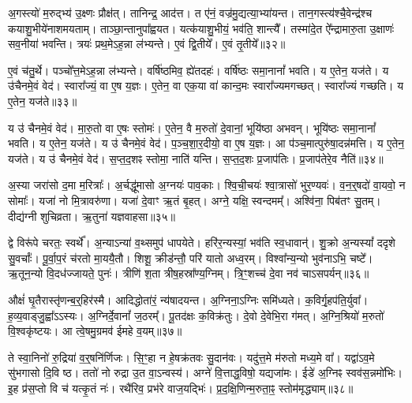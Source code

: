 अ॒गस्त्यो॑ म॒रुद्भ्य॑ उ॒क्ष्णः प्रौक्ष॑त्।
तानिन्द्र॒ आद॑त्त।
त ए॑नं॒ वज्र॑मु॒द्यत्या॒भ्या॑यन्त।
तान॒गस्त्य॑श्चै॒वेन्द्र॑श्च कयाशु॒भीये॑नाशमयताम्।
ताञ्छा॒न्तानुपा᳚ह्वयत।
यत्क॑याशु॒भीयं॒ भव॑ति॒ शान्त्यै᳚।
तस्मा॑दे॒त ऐ᳚न्द्रामारु॒ता उ॒क्षाणः॑ सव॒नीया॑ भवन्ति।
त्रयः॑ प्रथ॒मे\-ऽह॒न्ना ल॑भ्यन्ते।
ए॒वं द्वि॒तीये᳚।
ए॒वं तृ॒तीये᳚॥३२॥

ए॒वं च॑तु॒र्थे।
पञ्चो᳚त्त॒मे\-ऽह॒न्ना ल॑भ्यन्ते।
वर्\mbox{}षि॑ष्ठमिव॒ ह्ये॑तदहः॑।
वर्\mbox{}षि॑ष्ठः समा॒नानां᳚ भवति।
य ए॒तेन॒ यज॑ते।
य उ॑चैनमे॒वं वेद॑।
स्वारा᳚ज्यं॒ वा ए॒ष य॒ज्ञः।
ए॒तेन॒ वा एक॒या वा॑ कान्द॒मः स्वारा᳚ज्यमगच्छत्।
स्वारा᳚ज्यं गच्छति।
य ए॒तेन॒ यज॑ते॥३३॥

य उ॑ चैनमे॒वं वेद॑।
मा॒रु॒तो वा ए॒षः स्तोमः॑।
ए॒तेन॒ वै म॒रुतो॑ दे॒वानां॒ भूयि॑ष्ठा अभवन्।
भूयि॑ष्ठः समा॒नानां᳚ भवति।
य ए॒तेन॒ यज॑ते।
य उ॑ चैनमे॒वं वेद॑।
प॒ञ्च॒शा॒र॒दीयो॒ वा ए॒ष य॒ज्ञः।
आ प॑ञ्च॒मात्पुरु॑षा॒दन्न॑मत्ति।
य ए॒तेन॒ यज॑ते।
य उ॑ चैनमे॒वं वेद॑।
स॒प्त॒द॒शꣴ स्तोमा॒ नाति॑ यन्ति।
स॒प्त॒द॒शः प्र॒जा\-प॑तिः।
प्र॒जा\-प॑तेरे॒व नैति॑॥३४॥\anuvakamend[तृ॒तीये॑ गच्छति॒ य ए॒तेन॒ यज॑ते\-ऽत्ति॒ य ए॒तेन॒ यज॑ते॒ य उ॑ चैनमे॒वं वेद॒ त्रीणि॑ च (अ॒गस्त्यः॒ स्वारा᳚ज्यं मारु॒तः प॑ञ्चशार॒दीयो॒ वा ए॒ष य॒ज्ञः स॑प्तद॒शं प्र॒जा\-प॑तेरे॒व नैति॑॥)]

अ॒स्या जरा॑सो द॒मा म॒रित्राः᳚।
अ॒र्चद्धू॑मासो अ॒ग्नयः॑ पाव॒काः।
श्वि॒ची॒चयः॑ श्वा॒त्रासो॑ भुर॒ण्यवः॑।
व॒न॒र्॒षदो॑ वा॒यवो॒ न सोमाः᳚।
यजा॑ नो मि॒त्रावरु॑णा।
यजा॑ दे॒वाꣳ ऋ॒तं बृ॒हत्।
अग्ने॒ यक्षि॒ स्वन्दमम्᳚।
अश्वि॑ना॒ पिब॑तꣳ सु॒तम्।
दीद्य॑ग्नी शुचिव्रता।
ऋ॒तुना॑ यज्ञवाहसा॥३५॥

द्वे विरू॑पे चरतः॒ स्वर्थे᳚।
अ॒न्या\-ऽन्या॑ व॒थ्समुप॑ धापयेते।
हरि॑र॒न्यस्यां॒ भव॑ति स्व॒धावान्॑।
शु॒क्रो अ॒न्यस्यां᳚ ददृशे सु॒वर्चाः᳚।
पू॒र्वा॒प॒रं च॑रतो मा॒ययै॒तौ।
शिशू॒ क्रीड॑न्तौ॒ परि॑ यातो अध्व॒रम्।
विश्वा᳚न्य॒न्यो भुव॑नाऽभि॒ चष्टे᳚।
ऋ॒तून॒न्यो वि॒दध॑ज्जायते॒ पुनः॑।
त्रीणि॑ श॒ता त्रीष॒हस्रा᳚ण्य॒ग्निम्।
त्रि॒ꣳ॒शच्च॑ दे॒वा नव॑ चाऽसपर्यन्॥३६॥

औक्षं॑ घृ॒तैरास्तृ॑णन्ब॒र्॒हिर॑स्मै।
आदिद्धोता॑रं॒ न्य॑षादयन्त।
अ॒ग्निना॒\-ऽग्निः समि॑ध्यते।
क॒विर्गृ॒हप॑ति॒र्युवा᳚।
ह॒व्य॒वाड्जु॒ह्वा᳚ऽऽस्यः।
अ॒ग्निर्दे॒वानां᳚ ज॒ठरम्᳚।
पू॒तद॑क्षः क॒विक्र॑तुः।
दे॒वो दे॒वेभि॒रा ग॑मत्।
अ॒ग्नि॒श्रियो॑ म॒रुतो॑ वि॒श्वकृ॑ष्टयः।
आ त्वे॒षमु॒ग्रमव॑ ईमहे व॒यम्॥३७॥

ते स्वा॒निनो॑ रु॒द्रिया॑ व॒र्॒षनि॑र्णिजः।
सि॒ꣳ॒हा न हे॒षक्र॑तवः सु॒दान॑वः।
यदु॑त्त॒मे म॑रुतो मध्य॒मे वा᳚।
यद्वा॑\-ऽव॒मे सु॑भगासो दि॒वि ष्ठ।
ततो॑ नो रुद्रा उ॒त वा॒\-ऽन्वस्य॑।
अग्ने॑ वि॒त्ताद्ध॒विषो॒ यद्यजा॑मः।
ईडे॑ अ॒ग्निꣴ स्वव॑स॒न्नमो॑भिः।
इ॒ह प्र॑स॒प्तो वि च॑ यत्कृ॒तं नः॑।
रथै॑रिव॒ प्रभ॑रे वाज॒यद्भिः॑।
प्र॒द॒क्षि॒णिन्म॒रुता॒ꣴ॒ स्तोम॑मृद्ध्याम्॥३८॥

